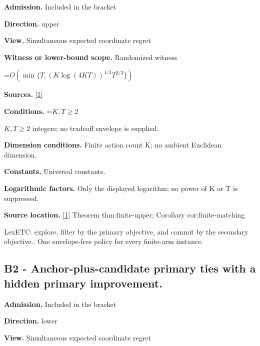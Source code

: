 \documentclass[10pt,a4paper]{article}
\newcommand{\AtlasMath}[1]{\par\begingroup\centering\setbox0=\hbox{$\displaystyle #1$}\ifdim\wd0>1.4\linewidth\typeout{ATLAS WIDE FORMULA: \the\wd0}\fi\ifdim\wd0>\linewidth\resizebox{\linewidth}{!}{\box0}\else\box0\fi\par\endgroup}
\newcommand{\AtlasInlineMath}[1]{\begingroup\setbox0=\hbox{$#1$}\ifdim\wd0>.4\linewidth\endgroup\AtlasMath{#1}\else\endgroup$#1$\fi}
\begin{document}
\textbf{Admission.} Included in the bracket



\textbf{Direction.} upper



\textbf{View.} Simultaneous expected coordinate regret



\textbf{Witness or lower-bound scope.} Randomized witness



\AtlasMath{O\!\left(\min\{T,(K\log(4KT))^{1/3}T^{2/3}\}\right)}


\textbf{Sources.} \href{https://github.com/WU-Wendao/Colombo/blob/main/colombo_sensorium/Complexity_altas/data/sources/colombo/U07/manuscript.pdf}{[1]}



\textbf{Conditions.} \AtlasInlineMath{K,T\ge2} integers; no tradeoff envelope is supplied.



\textbf{Dimension conditions.} Finite action count K; no ambient Euclidean dimension.



\textbf{Constants.} Universal constants.



\textbf{Logarithmic factors.} Only the displayed logarithm; no power of K or T is suppressed.



\textbf{Source location.} \href{https://github.com/WU-Wendao/Colombo/blob/main/colombo_sensorium/Complexity_altas/data/sources/colombo/U07/manuscript.pdf}{[1]} Theorem thm:finite-upper; Corollary cor:finite-matching



LexETC: explore, filter by the primary objective, and commit by the secondary objective.. One envelope-free policy for every finite-arm instance.



\subsection{B2 - Anchor-plus-candidate primary ties with a hidden primary improvement.}


\textbf{Admission.} Included in the bracket



\textbf{Direction.} lower



\textbf{View.} Simultaneous expected coordinate regret
\end{document}
